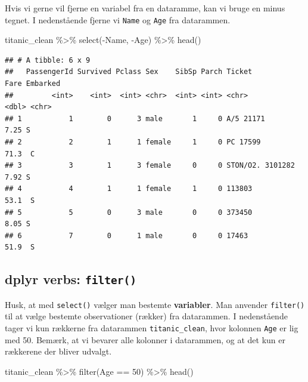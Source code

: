 \documentclass[
]{book}
\newenvironment{Shaded}{\begin{snugshade}}{\end{snugshade}}
\newcommand{\DecValTok}[1]{\textcolor[rgb]{0.00,0.00,0.81}{#1}}
\newcommand{\FunctionTok}[1]{\textcolor[rgb]{0.00,0.00,0.00}{#1}}
\newcommand{\NormalTok}[1]{#1}
\newcommand{\SpecialCharTok}[1]{\textcolor[rgb]{0.00,0.00,0.00}{#1}}
\begin{document}
Hvis vi gerne vil fjerne en variabel fra en dataramme, kan vi bruge en minus tegnet. I nedenstående fjerne vi \texttt{Name} og \texttt{Age} fra datarammen.

\begin{Shaded}
\begin{Highlighting}[]
\NormalTok{titanic\_clean }\SpecialCharTok{\%\textgreater{}\%} 
  \FunctionTok{select}\NormalTok{(}\SpecialCharTok{{-}}\NormalTok{Name, }\SpecialCharTok{{-}}\NormalTok{Age) }\SpecialCharTok{\%\textgreater{}\%}
  \FunctionTok{head}\NormalTok{()}
\end{Highlighting}
\end{Shaded}

\begin{verbatim}
## # A tibble: 6 x 9
##   PassengerId Survived Pclass Sex    SibSp Parch Ticket            Fare Embarked
##         <int>    <int>  <int> <chr>  <int> <int> <chr>            <dbl> <chr>   
## 1           1        0      3 male       1     0 A/5 21171         7.25 S       
## 2           2        1      1 female     1     0 PC 17599         71.3  C       
## 3           3        1      3 female     0     0 STON/O2. 3101282  7.92 S       
## 4           4        1      1 female     1     0 113803           53.1  S       
## 5           5        0      3 male       0     0 373450            8.05 S       
## 6           7        0      1 male       0     0 17463            51.9  S
\end{verbatim}

\hypertarget{dplyr-verbs-filter}{%
\subsection{\texorpdfstring{dplyr verbs: \texttt{filter()}}{dplyr verbs: filter()}}\label{dplyr-verbs-filter}}

Husk, at med \texttt{select()} vælger man bestemte \textbf{variabler}. Man anvender \texttt{filter()} til at vælge bestemte observationer (rækker) fra datarammen. I nedenstående tager vi kun rækkerne fra datarammen \texttt{titanic\_clean}, hvor kolonnen \texttt{Age} er lig med 50. Bemærk, at vi bevarer alle kolonner i datarammen, og at det kun er rækkerene der bliver udvalgt.

\begin{Shaded}
\begin{Highlighting}[]
\NormalTok{titanic\_clean }\SpecialCharTok{\%\textgreater{}\%} 
  \FunctionTok{filter}\NormalTok{(Age }\SpecialCharTok{==} \DecValTok{50}\NormalTok{) }\SpecialCharTok{\%\textgreater{}\%}
  \FunctionTok{head}\NormalTok{()}
\end{Highlighting}
\end{Shaded}
\end{document}
